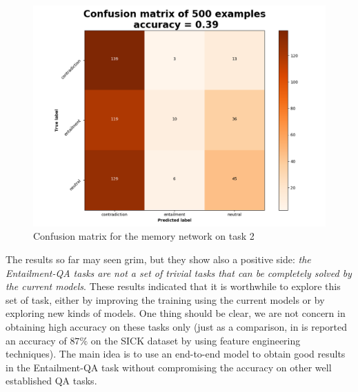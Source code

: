 \begin{center}
\begin{figure}[h]
\includegraphics[width=13.0cm]{img/cm_mem_EntailQA2.png}
\caption{Confusion matrix for the memory network on task 2}
\end{figure}
\end{center}


The results so far may seen grim, but they show also a positive side: \textit{the Entailment-QA tasks are not a set of trivial tasks that can be completely solved by the current models}. These results indicated that it is worthwhile to explore this set of task, either by improving the training using the current models or by exploring new kinds of models. One thing should be clear, we are not concern in obtaining high accuracy on these tasks only (just as a comparison, in \cite{S14-2055} is reported an accuracy of $87\%$ on the SICK dataset by using feature engineering techniques). The main idea is to use an end-to-end model to obtain good results in the Entailment-QA task without compromising the accuracy on other well established QA tasks.  
